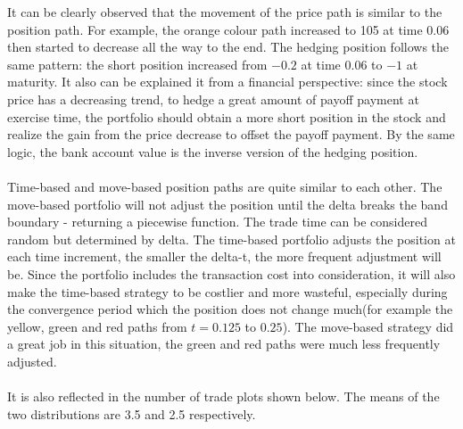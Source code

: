 \documentclass[12pt]{article}
\begin{document}
It can be clearly observed that the movement of the price path is similar to the position path. For example, the orange colour path increased to 105 at time 0.06 then started to decrease all the way to the end. The hedging position follows the same pattern: the short position 
increased from $-0.2$ at time $0.06$ to $-1$ at maturity. It also can be explained it from a financial perspective: since the stock price has a decreasing trend, to hedge a great amount of payoff payment at exercise time, the portfolio should obtain a more short position in the stock
 and realize the gain from the price decrease to offset the payoff payment. By the same logic, the bank account value is the inverse version of the hedging position.
\\\\
Time-based and move-based position paths are quite similar to each other. The move-based portfolio will not adjust the position until the delta breaks the band boundary - returning a piecewise function. The trade time can be considered random but determined by delta. The 
time-based portfolio adjusts the position at each time increment, the smaller the delta-t, the more frequent adjustment will be. Since the portfolio includes the transaction cost into consideration, it will also make the time-based strategy to be costlier and more wasteful, 
especially during the convergence period which the position does not change much(for example the yellow, green and red paths from $t = 0.125$ to $0.25$). The move-based strategy did a great job in this situation, the green and red paths were much less frequently adjusted.
\\\\
It is also reflected in the number of trade plots shown below. The means of the two distributions are 3.5 and 2.5 respectively.
\end{document}
